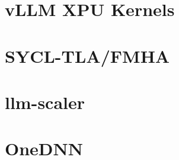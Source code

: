 \documentclass[8pt]{article}
\begin{document}
\section{vLLM XPU Kernels}
    
\section{SYCL-TLA/FMHA}
    
\section{llm-scaler}
    
\section{OneDNN}
    
\end{document}
